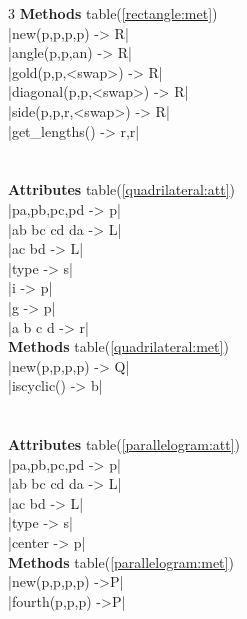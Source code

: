 \documentclass[DIV         = 14,
               fontsize    = 10,
               index       = totoc,
               twoside,
               cadre,
               headings    = small
               ]{tkz-doc}
\begin{document}
\begin{multicols}{3}
 \textbf{Methods} table(\ref{rectangle:met}) \\
|new(p,p,p,p)              -> R|   \\ 
|angle(p,p,an)             -> R|   \\
|gold(p,p,<swap>)          -> R|   \\
|diagonal(p,p,<swap>)      -> R|   \\
|side(p,p,r,<swap>)        -> R|   \\
|get_lengths()           -> r,r|   \\
                                  \\
     \\
 \textbf{Attributes} table(\ref{quadrilateral:att}) \\
|pa,pb,pc,pd               -> p|  \\
|ab bc cd da               -> L|  \\
|ac bd                     -> L|  \\
|type                      -> s|  \\
|i                         -> p|  \\
|g                         -> p|  \\
|a b c d                   -> r|  \\
 \textbf{Methods} table(\ref{quadrilateral:met}) \\
|new(p,p,p,p)              -> Q|  \\ 
|iscyclic()                -> b|  \\         
                                  \\
     \\
 \textbf{Attributes} table(\ref{parallelogram:att}) \\
|pa,pb,pc,pd               -> p|  \\
|ab bc cd da               -> L|  \\
|ac bd                     -> L|  \\
|type                      -> s|  \\
|center                    -> p|   \\
 \textbf{Methods} table(\ref{parallelogram:met}) \\
|new(p,p,p,p)               ->P|     \\ 
|fourth(p,p,p)              ->P|     \\
                                   \\
   \\

\end{multicols}
\end{document}
